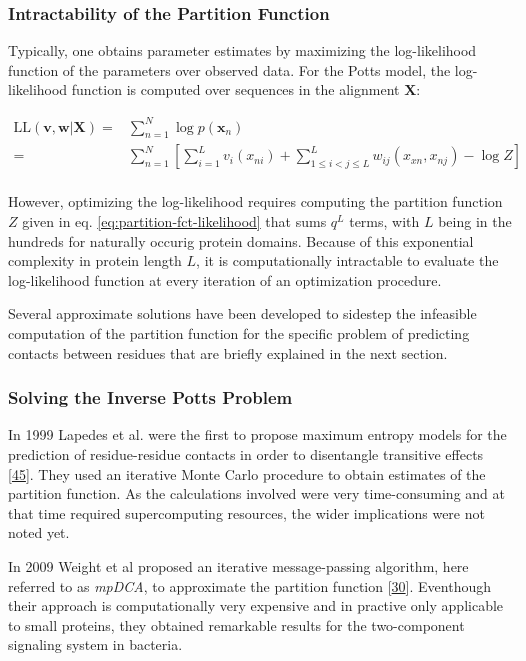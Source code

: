 \documentclass[12pt,a4paper,twoside]{book}
\newcommand{\seq}{\mathbf{x}}
\renewcommand{\v}{\mathbf{v}}
\newcommand{\w}{\mathbf{w}}
\theoremstyle{definition}
\theoremstyle{definition}
\theoremstyle{remark}
\begin{document}
\subsubsection{Intractability of the Partition
Function}\label{partition-function}

Typically, one obtains parameter estimates by maximizing the
log-likelihood function of the parameters over observed data. For the
Potts model, the log-likelihood function is computed over sequences in
the alignment \(\mathbf{X}\):

\begin{align}
    \text{LL}(\v, \w | \mathbf{X}) =& \sum_{n=1}^N \log p(\seq_n) \\
    =& \sum_{n=1}^N \left[ \sum_{i=1}^L v_i(x_{ni}) + \sum_{1 \leq i < j \leq L}^L w_{ij}(x_{xn}, x_{nj}) - \log Z \right] \\
\label{eq:full-log-likelihood}
\end{align}

However, optimizing the log-likelihood requires computing the partition
function \(Z\) given in eq. \eqref{eq:partition-fct-likelihood} that sums
\(q^L\) terms, with \(L\) being in the hundreds for naturally occurig
protein domains. Because of this exponential complexity in protein
length \(L\), it is computationally intractable to evaluate the
log-likelihood function at every iteration of an optimization procedure.

Several approximate solutions have been developed to sidestep the
infeasible computation of the partition function for the specific
problem of predicting contacts between residues that are briefly
explained in the next section.

\subsubsection{Solving the Inverse Potts
Problem}\label{solving-the-inverse-potts-problem}

In 1999 Lapedes et al. were the first to propose maximum entropy models
for the prediction of residue-residue contacts in order to disentangle
transitive effects {[}\protect\hyperlink{ref-Lapedes1999}{45}{]}. They
used an iterative Monte Carlo procedure to obtain estimates of the
partition function. As the calculations involved were very
time-consuming and at that time required supercomputing resources, the
wider implications were not noted yet.

In 2009 Weight et al proposed an iterative message-passing algorithm,
here referred to as \emph{mpDCA}, to approximate the partition function
{[}\protect\hyperlink{ref-Weigt2009}{30}{]}. Eventhough their approach
is computationally very expensive and in practive only applicable to
small proteins, they obtained remarkable results for the two-component
signaling system in bacteria.
\end{document}
